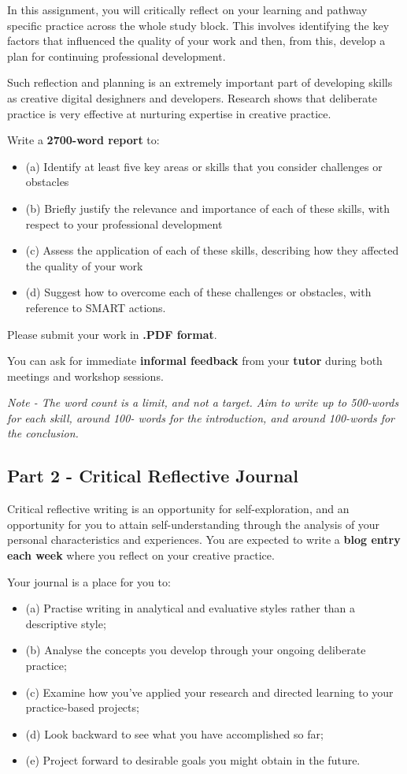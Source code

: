 \documentclass{../../fal_assignment}
\begin{document}
In this assignment, you will critically reflect on your learning and pathway specific practice across the whole study block. This involves identifying the key factors that influenced the quality of your work and then, from this, develop a plan for continuing professional development.

Such reflection and planning is an extremely important part of developing skills as creative digital desighners and developers. Research shows that deliberate practice is very effective at nurturing expertise in creative practice.

Write a \textbf{2700-word report} to:
\begin{itemize}
	\item (a) Identify at least five key areas or skills that you consider challenges or obstacles
	\item (b) Briefly justify the relevance and importance of each of these skills, with respect to your professional development
	\item (c) Assess the application of each of these skills, describing how they affected the quality of your work
	\item (d) Suggest how to overcome each of these challenges or obstacles, with reference to SMART actions.
\end{itemize}

Please submit your work in \textbf{.PDF format}.

You can ask for immediate \textbf{informal feedback} from your \textbf{tutor} during both meetings and workshop sessions.

\emph{Note - The word count is a limit, and not a target. Aim to write up to 500-words for each skill, around 100- words for the introduction, and around 100-words for the conclusion.}

\subsection*{Part 2 - Critical Reflective Journal} 

Critical reflective writing is an opportunity for self-exploration, and an opportunity for you to attain self-understanding through the analysis of your personal characteristics and experiences. You are expected to write a \textbf{blog entry each week} where you reflect on your creative practice.

Your journal is a place for you to:
\begin{itemize}
\item (a) Practise writing in analytical and evaluative styles rather than a descriptive style;
\item (b) Analyse the concepts you develop through your ongoing deliberate practice;
\item (c) Examine how you’ve applied your research and directed learning to your practice-based projects;
\item (d) Look backward to see what you have accomplished so far;
\item (e) Project forward to desirable goals you might obtain in the future.
\end{itemize}
\end{document}
